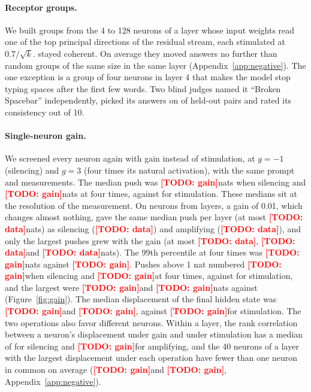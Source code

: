 \documentclass[11pt]{article}
\providecommand{\GainZeroMedian}{\todo{gain}}\providecommand{\GainFourMedian}{\todo{gain}}
\providecommand{\GainZeroMax}{\todo{gain}}\providecommand{\GainFourMax}{\todo{gain}}
\providecommand{\GainZeroOverOne}{\todo{gain}}\providecommand{\GainFourOverOne}{\todo{gain}}
\providecommand{\StimPctl}{\todo{gain}}\providecommand{\GainFourPctl}{\todo{gain}}
\providecommand{\GainZeroDispMedian}{\todo{gain}}\providecommand{\GainFourDispMedian}{\todo{gain}}
\providecommand{\StimDispMedian}{\todo{gain}}\providecommand{\GainZeroPushRho}{\todo{gain}}
\providecommand{\GainFourDispRho}{\todo{gain}}\providecommand{\GainZeroOverlap}{\todo{gain}}
\providecommand{\GainFourOverlap}{\todo{gain}}\providecommand{\GainSurvScreen}{\todo{gain}}
\providecommand{\FloorMedian}{\todo{data}}\providecommand{\FloorMax}{\todo{data}}\providecommand{\FloorZeroMedian}{\todo{data}}
\providecommand{\FloorZeroMax}{\todo{data}}\providecommand{\FloorFourMedian}{\todo{data}}\providecommand{\FloorFourMax}{\todo{data}}\providecommand{\GainIdentical}{\todo{gain}}
\newcommand{\todo}[1]{\textcolor{red}{\textbf{[TODO: #1]}}}
\begin{document}
\paragraph{Receptor groups.} We built \NDrugs groups from the 4 to 128 neurons of a layer whose input weights read
one of the top principal directions of the residual stream, each stimulated at $0.7/\sqrt{k}$. \NDrugsCoherent stayed
coherent. On average they moved answers no further than random groups of the same size in the same layer
(Appendix~\ref{app:negative}). The one exception is a group of four neurons in layer 4 that makes the model stop typing spaces after the
first few words. Two blind judges named it ``Broken Spacebar'' independently, picked its answers on \SpacebarCorrect
of \SpacebarPairs held-out pairs and rated its consistency \SpacebarCons out of 10.

\paragraph{Single-neuron gain.} We screened every neuron again with gain instead of stimulation, at $g = -1$
(silencing) and $g = 3$ (four times its natural activation), with the same prompt and measurements. The median push
was \GainZeroMedian nats when silencing and \GainFourMedian nats at four times, against \ScreenMedian for
stimulation. These medians sit at the resolution of the measurement. On \FloorNeurons neurons from \FloorLayers
layers, a gain of 0.01, which changes almost nothing, gave the same median push per layer (at most \FloorMedian nats)
as silencing (\FloorZeroMedian) and amplifying (\FloorFourMedian), and only the largest pushes grew with the gain (at
most \FloorMax, \FloorZeroMax and \FloorFourMax nats). The 99th percentile at four times was \GainFourPctl nats against \StimPctl. Pushes above 1 nat
numbered \GainZeroOverOne when silencing and \GainFourOverOne at four times, against \ScreenOverOne for stimulation,
and the largest were \GainZeroMax and \GainFourMax nats against \ScreenMax (Figure~\ref{fig:gain}). The median
displacement of the final hidden state was \GainZeroDispMedian and \GainFourDispMedian, against \StimDispMedian for
stimulation. The two operations also favor different neurons. Within a layer, the rank correlation between a
neuron's displacement under gain and under stimulation has a median of \GainZeroDispRho for silencing and
\GainFourDispRho for amplifying, and the 40 neurons of a layer with the largest displacement under each operation
have fewer than one neuron in common on average (\GainZeroOverlap and \GainFourOverlap,
Appendix~\ref{app:negative}).
\end{document}
